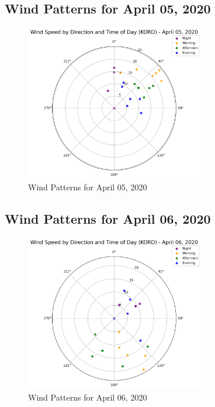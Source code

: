 \subsection{Wind Patterns for April 05, 2020}
\begin{figure}[htbp]
\centering
\includegraphics[width=0.7\textwidth]{wind_radar_plot_20200405.png}
\caption{Wind Patterns for April 05, 2020}
\label{fig:wind_20200405}
\end{figure}

\subsection{Wind Patterns for April 06, 2020}
\begin{figure}[htbp]
\centering
\includegraphics[width=0.7\textwidth]{wind_radar_plot_20200406.png}
\caption{Wind Patterns for April 06, 2020}
\label{fig:wind_20200406}
\end{figure}

